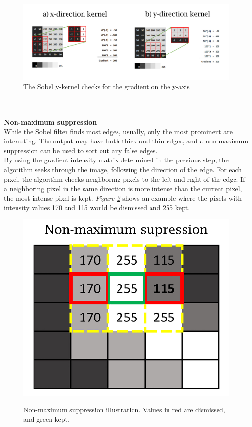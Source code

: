 \begin{figure}[htbp]
        \centering
        \includegraphics[width=1\linewidth]{figures/PDF/Sobel_kernel.pdf}
        \caption{The Sobel y-kernel checks for the gradient on the y-axis}
        \label{fig:sobel kernel}
\end{figure} \\\\

\noindent \textbf{Non-maximum suppression}\\
\noindent While the Sobel filter finds most edges, usually, only the most prominent are interesting. The output may have both thick and thin edges, and a non-maximum suppression can be used to sort out any false edges. \\

\noindent By using the gradient intensity matrix determined in the previous step, the algorithm seeks through the image, following the direction of the edge. For each pixel, the algorithm checks neighboring pixels to the left and right of the edge. If a neighboring pixel in the same direction is more intense than the current pixel, the most intense pixel is kept. \textit{Figure \ref{fig:canny suppression}} shows an example where the pixels with intensity values 170 and 115 would be dismissed and 255 kept.\\

\begin{figure}[htbp]
    \centering
     \includegraphics[width=.37\linewidth]{figures/PDF/Suppresion.pdf}\\
    \caption{Non-maximum suppression illustration. Values in red are dismissed, and green kept.}
    \label{fig:canny suppression}
\end{figure}

